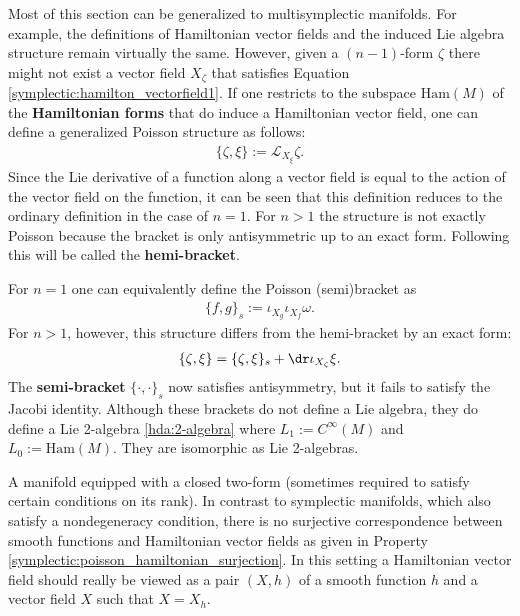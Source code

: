     \begin{remark}\label{symplectic:hamiltonian_forms}
        Most of this section can be generalized to multisymplectic manifolds. For example, the definitions of Hamiltonian vector fields and the induced Lie algebra structure remain virtually the same. However, given a $(n-1)$-form $\zeta$ there might not exist a vector field $X_\zeta$ that satisfies Equation \eqref{symplectic:hamilton_vectorfield1}. If one restricts to the subspace $\mathrm{Ham}(M)$ of the \textbf{Hamiltonian forms} that do induce a Hamiltonian vector field, one can define a generalized Poisson structure as follows:
        \begin{gather}
            \{\zeta,\xi\} := \mathcal{L}_{X_\xi}\zeta.
        \end{gather}
        Since the Lie derivative of a function along a vector field is equal to the action of the vector field on the function, it can be seen that this definition reduces to the ordinary definition in the case of $n=1$. For $n>1$ the structure is not exactly Poisson because the bracket is only antisymmetric up to an exact form. Following \cite{category_symplectic} this will be called the \textbf{hemi-bracket}.

        For $n=1$ one can equivalently define the Poisson (semi)bracket as
        \begin{gather}
            \{f,g\}_s := \iota_{X_g}\iota_{X_f}\omega.
        \end{gather}
        For $n>1$, however, this structure differs from the hemi-bracket by an exact form:
        \begin{gather}
            \{\zeta,\xi\} = \{\zeta,\xi\}_s + \dr\iota_{X_\zeta}\xi.
        \end{gather}
        The \textbf{semi-bracket} $\{\cdot,\cdot\}_s$ now satisfies antisymmetry, but it fails to satisfy the Jacobi identity. Although these brackets do not define a Lie algebra, they do define a Lie 2-algebra \ref{hda:2-algebra} where $L_1:=C^\infty(M)$ and $L_0:=\mathrm{Ham}(M)$. They are isomorphic as Lie 2-algebras.
    \end{remark}

    \begin{remark}
        A manifold equipped with a closed two-form (sometimes required to satisfy certain conditions on its rank). In contrast to symplectic manifolds, which also satisfy a nondegeneracy condition, there is no surjective correspondence between smooth functions and Hamiltonian vector fields as given in Property \ref{symplectic:poisson_hamiltonian_surjection}. In this setting a Hamiltonian vector field should really be viewed as a pair $(X,h)$ of a smooth function $h$ and a vector field $X$ such that $X=X_h$.
    \end{remark}

